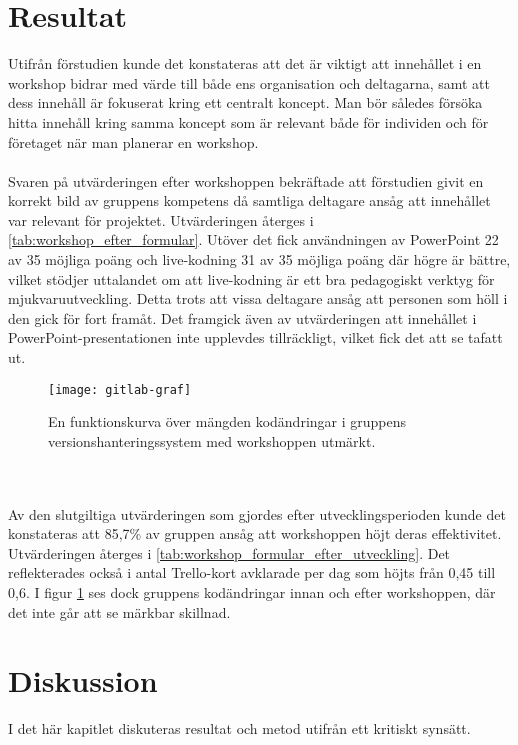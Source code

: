 \section{Resultat}
\label{cha:seba-results}
Utifrån förstudien kunde det konstateras att det är viktigt att innehållet i en workshop bidrar
med värde till både ens organisation och deltagarna, samt att dess innehåll är fokuserat kring ett
centralt koncept. Man bör således försöka hitta innehåll kring samma koncept som är relevant
både för individen och för företaget när man planerar en workshop.
\\ \\
Svaren på utvärderingen efter workshoppen bekräftade att förstudien givit en korrekt bild av
gruppens kompetens då samtliga deltagare ansåg att innehållet var relevant för projektet.
Utvärderingen återges i \ref{tab:workshop_efter_formular}.
Utöver det fick användningen av PowerPoint 22 av 35 möjliga poäng och live-kodning 31 av 35
möjliga poäng där högre är bättre, vilket stödjer uttalandet om att live-kodning är ett bra
pedagogiskt verktyg för mjukvaruutveckling. Detta trots att vissa deltagare ansåg att personen
som höll i den gick för fort framåt. Det framgick även av utvärderingen att innehållet i
PowerPoint-presentationen inte upplevdes tillräckligt, vilket fick det att se tafatt ut.
\begin{figure}[ht!]
\centering
\texttt{[image: gitlab-graf]}
\caption{En funktionskurva över mängden kodändringar i
  gruppens versionshanteringssystem med workshoppen utmärkt. \label{img:gitlab-graf}}
\end{figure}
\\ \\
Av den slutgiltiga utvärderingen som gjordes efter utvecklingsperioden kunde det konstateras
att 85,7\% av gruppen ansåg att workshoppen höjt deras effektivitet. Utvärderingen återges i
 \ref{tab:workshop_formular_efter_utveckling}. Det reflekterades också i
antal Trello-kort avklarade per dag som höjts från 0,45 till 0,6. I figur \ref{img:gitlab-graf}
ses dock gruppens kodändringar innan och efter workshoppen, där det inte går att se
märkbar skillnad.

\section{Diskussion}
\label{cha:seba-discussion}
I det här kapitlet diskuteras resultat och metod utifrån ett kritiskt synsätt.

